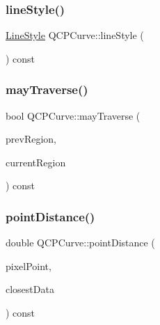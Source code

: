 \subsubsection{\texorpdfstring{lineStyle()}{lineStyle()}}
{\footnotesize\ttfamily \mbox{\hyperlink{class_q_c_p_curve_a2710e9f79302152cff794c6e16cc01f1}{Line\+Style}} Q\+C\+P\+Curve\+::line\+Style (\begin{DoxyParamCaption}{ }\end{DoxyParamCaption}) const\hspace{0.3cm}{\ttfamily [inline]}}

\mbox{\label{class_q_c_p_curve_af5df2560b30333fe662ec676bd355415}} 
\subsubsection{\texorpdfstring{mayTraverse()}{mayTraverse()}}
{\footnotesize\ttfamily bool Q\+C\+P\+Curve\+::may\+Traverse (\begin{DoxyParamCaption}\item[{int}]{prev\+Region,  }\item[{int}]{current\+Region }\end{DoxyParamCaption}) const\hspace{0.3cm}{\ttfamily [protected]}}

\mbox{\label{class_q_c_p_curve_aa2c9c9c0e57f11f18a5cb7e47927157c}} 
\subsubsection{\texorpdfstring{pointDistance()}{pointDistance()}}
{\footnotesize\ttfamily double Q\+C\+P\+Curve\+::point\+Distance (\begin{DoxyParamCaption}\item[{const Q\+PointF \&}]{pixel\+Point,  }\item[{\mbox{\hyperlink{class_q_c_p_data_container_ae40a91f5cb0bcac61d727427449b7d15}{Q\+C\+P\+Curve\+Data\+Container\+::const\+\_\+iterator}} \&}]{closest\+Data }\end{DoxyParamCaption}) const\hspace{0.3cm}{\ttfamily [protected]}}

